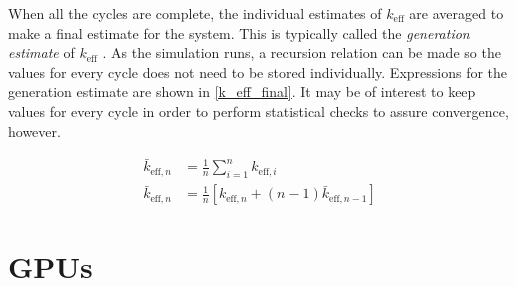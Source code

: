 When all the cycles are complete, the individual estimates of $k_\mathrm{eff}$ are averaged to make a final estimate for the system.  This is typically called the \emph{generation estimate} of $k_\mathrm{eff}$ \cite{jaakko}.  As the simulation runs, a recursion relation can be made so the values for every cycle does not need to be stored individually.  Expressions for the generation estimate are shown in \eqref{k_eff_final}.  It may be of interest to keep values for every cycle in order to perform statistical checks to assure convergence, however.

\begin{equation}
\label{k_eff_final}
\begin{split}
\bar{k}_{\mathrm{eff},n} &= \frac{1}{n} \sum_{i=1}^{n} k_{\mathrm{eff},i} \\
\bar{k}_{\mathrm{eff},n} &= \frac{1}{n} \left[ k_{\mathrm{eff},n} + (n-1) \bar{k}_{\mathrm{eff},n-1}  \right]
\end{split}
\end{equation}



\section{GPUs}


